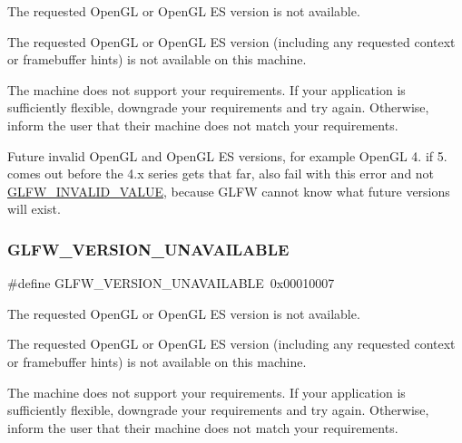 The requested Open\+GL or Open\+GL ES version is not available. 

The requested Open\+GL or Open\+GL ES version (including any requested context or framebuffer hints) is not available on this machine.

The machine does not support your requirements. If your application is sufficiently flexible, downgrade your requirements and try again. Otherwise, inform the user that their machine does not match your requirements.

\begin{DoxyParagraph}{}
Future invalid Open\+GL and Open\+GL ES versions, for example Open\+GL 4. if 5. comes out before the 4.\+x series gets that far, also fail with this error and not \hyperlink{group__errors_gaaf2ef9aa8202c2b82ac2d921e554c687}{G\+L\+F\+W\+\_\+\+I\+N\+V\+A\+L\+I\+D\+\_\+\+V\+A\+L\+UE}, because G\+L\+FW cannot know what future versions will exist. 
\end{DoxyParagraph}
\mbox{\label{group__errors_gad16c5565b4a69f9c2a9ac2c0dbc89462}} 
\subsubsection{\texorpdfstring{G\+L\+F\+W\+\_\+\+V\+E\+R\+S\+I\+O\+N\+\_\+\+U\+N\+A\+V\+A\+I\+L\+A\+B\+LE}{GLFW\_VERSION\_UNAVAILABLE}\hspace{0.1cm}{\footnotesize\ttfamily [2/5]}}
{\footnotesize\ttfamily \#define G\+L\+F\+W\+\_\+\+V\+E\+R\+S\+I\+O\+N\+\_\+\+U\+N\+A\+V\+A\+I\+L\+A\+B\+LE~0x00010007}



The requested Open\+GL or Open\+GL ES version is not available. 

The requested Open\+GL or Open\+GL ES version (including any requested context or framebuffer hints) is not available on this machine.

The machine does not support your requirements. If your application is sufficiently flexible, downgrade your requirements and try again. Otherwise, inform the user that their machine does not match your requirements.

